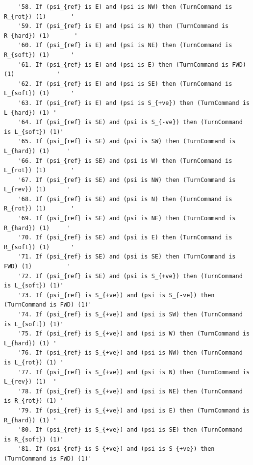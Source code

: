 \documentclass[10pt]{article}
\begin{document}
\begin{verbatim}
    '58. If (psi_{ref} is E) and (psi is NW) then (TurnCommand is R_{rot}) (1)       '
    '59. If (psi_{ref} is E) and (psi is N) then (TurnCommand is R_{hard}) (1)       '
    '60. If (psi_{ref} is E) and (psi is NE) then (TurnCommand is R_{soft}) (1)      '
    '61. If (psi_{ref} is E) and (psi is E) then (TurnCommand is FWD) (1)            '
    '62. If (psi_{ref} is E) and (psi is SE) then (TurnCommand is L_{soft}) (1)      '
    '63. If (psi_{ref} is E) and (psi is S_{+ve}) then (TurnCommand is L_{hard}) (1) '
    '64. If (psi_{ref} is SE) and (psi is S_{-ve}) then (TurnCommand is L_{soft}) (1)'
    '65. If (psi_{ref} is SE) and (psi is SW) then (TurnCommand is L_{hard}) (1)     '
    '66. If (psi_{ref} is SE) and (psi is W) then (TurnCommand is L_{rot}) (1)       '
    '67. If (psi_{ref} is SE) and (psi is NW) then (TurnCommand is L_{rev}) (1)      '
    '68. If (psi_{ref} is SE) and (psi is N) then (TurnCommand is R_{rot}) (1)       '
    '69. If (psi_{ref} is SE) and (psi is NE) then (TurnCommand is R_{hard}) (1)     '
    '70. If (psi_{ref} is SE) and (psi is E) then (TurnCommand is R_{soft}) (1)      '
    '71. If (psi_{ref} is SE) and (psi is SE) then (TurnCommand is FWD) (1)          '
    '72. If (psi_{ref} is SE) and (psi is S_{+ve}) then (TurnCommand is L_{soft}) (1)'
    '73. If (psi_{ref} is S_{+ve}) and (psi is S_{-ve}) then (TurnCommand is FWD) (1)'
    '74. If (psi_{ref} is S_{+ve}) and (psi is SW) then (TurnCommand is L_{soft}) (1)'
    '75. If (psi_{ref} is S_{+ve}) and (psi is W) then (TurnCommand is L_{hard}) (1) '
    '76. If (psi_{ref} is S_{+ve}) and (psi is NW) then (TurnCommand is L_{rot}) (1) '
    '77. If (psi_{ref} is S_{+ve}) and (psi is N) then (TurnCommand is L_{rev}) (1)  '
    '78. If (psi_{ref} is S_{+ve}) and (psi is NE) then (TurnCommand is R_{rot}) (1) '
    '79. If (psi_{ref} is S_{+ve}) and (psi is E) then (TurnCommand is R_{hard}) (1) '
    '80. If (psi_{ref} is S_{+ve}) and (psi is SE) then (TurnCommand is R_{soft}) (1)'
    '81. If (psi_{ref} is S_{+ve}) and (psi is S_{+ve}) then (TurnCommand is FWD) (1)'
\end{verbatim}
\end{document}
